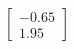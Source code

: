 \documentclass[preview]{standalone}
\begin{document}
\begin{align*}
\begin{bmatrix} -0.65 \\ 1.95 \end{bmatrix}
\end{align*}
\end{document}
